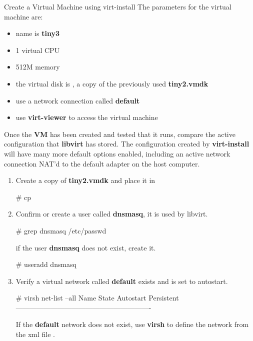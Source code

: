 \begin{Lab}
\begin{exe}  {Create a Virtual Machine using virt-install}
	 The parameters for the virtual machine are:
        \begin{itemize}
                \item name is \textbf{tiny3}
                \item 1 virtual CPU
                \item 512M memory
                \item the virtual disk is ,
			a copy of the previously used \textbf{tiny2.vmdk}
		\item use a network connection called \textbf{default}
                \item use \textbf{virt-viewer} to access the virtual machine
	\end{itemize} 

	Once the \textbf{VM} has been created and tested that it runs, compare the active 
	configuration that \textbf{libvirt} has stored. The configuration created by
	\textbf{virt-install} will have many more default options enabled, including 
	an active network connection NAT'd to the default adapter on the host computer.

	\begin{sol}
		\begin{enumerate}
		\item  Create a copy of \textbf{tiny2.vmdk} and place it in
			\begin{raw}
# cp  
			\end{raw}
		\item Confirm or create a user called \textbf{dnsmasq}, it is used by
			libvirt. 
		\begin{raw}
# grep dnsmasq /etc/passwd
		\end{raw} 
			if the user \textbf{dnsmasq}  does not exist, create it.
		\begin{raw}
# useradd dnsmasq
		\end{raw} 
		\item Verify a virtual network called \textbf{default} 
			exists and is set to autostart.
				\begin{raw}
# virsh net-list --all 
 Name                 State      Autostart     Persistent
----------------------------------------------------------

				\end{raw} 
			If the \textbf{default} network does not exist, use
				\textbf{virsh} to define the network from the xml
				file . 
				

\end{enumerate}
\end{sol}
\end{exe}
\end{Lab}
